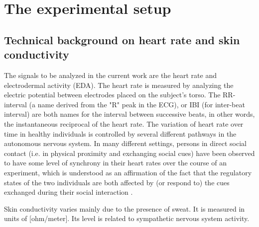 \documentclass[a4paper, 11pt]{report}      %
\begin{document}
\section{The experimental setup}

\subsection{Technical background on heart rate and skin \mbox{conductivity}}
The signals to be analyzed in the current work are the heart rate and electrodermal activity (EDA). 
The heart rate is measured by analyzing the electric potential between electrodes placed on the subject's torso. The RR-interval (a name derived from the "R" peak in the ECG), or IBI (for inter-beat interval) are both names for the interval between successive beats, in other words, the instantaneous reciprocal of the heart rate. The variation of heart rate over time in healthy individuals is controlled by several different pathways in the autonomous nervous system. In many different settings, persons in direct social contact (i.e. in physical proximity and exchanging social cues) have been observed to have some level of synchrony in their heart rates over the course of an experiment, which is understood as an affirmation of the fact that the regulatory states of the two individuals are both affected by (or respond to) the cues exchanged during their social interaction \citep{palumbo2017interpersonal}.

Skin conductivity varies mainly due to the presence of sweat. It is measured in units of [ohm\slash meter]. Its level is related to sympathetic nervous system activity.
\end{document}

